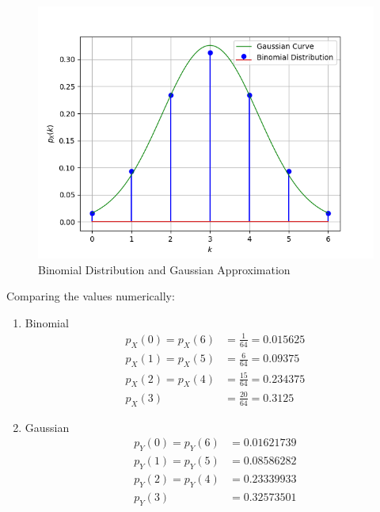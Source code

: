 \documentclass[journal,12pt,twocolumn]{IEEEtran}
\theoremstyle{remark}
\begin{document}
\begin{figure}[h]
\centering
\includegraphics[width=\columnwidth]{figures/PDF_and_PMF.png}
\caption{Binomial Distribution and Gaussian Approximation}
\label{fig:9.3.19}
\end{figure}
Comparing the values numerically:
\begin{enumerate}
\item Binomial
\begin{align}
	p_X(0) = p_X(6) &= \frac{1}{64} = 0.015625\\
	p_X(1) = p_X(5) &= \frac{6}{64} = 0.09375\\
	p_X(2) = p_X(4) &= \frac{15}{64} = 0.234375\\
	p_X(3) &= \frac{20}{64} = 0.3125
\end{align}
\item Gaussian
\begin{align}
        p_Y(0) = p_Y(6) &= 0.01621739\\
        p_Y(1) = p_Y(5) &= 0.08586282\\
        p_Y(2) = p_Y(4) &= 0.23339933\\
        p_Y(3) &= 0.32573501
\end{align}
\end{enumerate}
\end{document}
